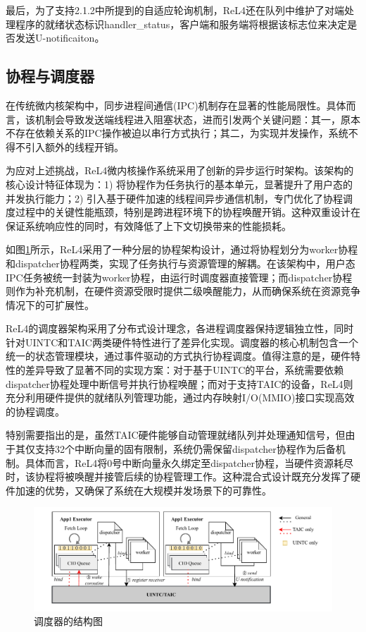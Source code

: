 最后，为了支持2.1.2中所提到的自适应轮询机制，ReL4还在队列中维护了对端处理程序的就绪状态标识handler\_status，客户端和服务端将根据该标志位来决定是否发送U-notificaiton。

\subsection{协程与调度器}
在传统微内核架构中，同步进程间通信(IPC)机制存在显著的性能局限性。具体而言，该机制会导致发送端线程进入阻塞状态，进而引发两个关键问题：其一，原本不存在依赖关系的IPC操作被迫以串行方式执行；其二，为实现并发操作，系统不得不引入额外的线程开销。

为应对上述挑战，ReL4微内核操作系统采用了创新的异步运行时架构。该架构的核心设计特征体现为：1) 将协程作为任务执行的基本单元，显著提升了用户态的并发执行能力；2) 引入基于硬件加速的线程间异步通信机制，专门优化了协程调度过程中的关键性能瓶颈，特别是跨进程环境下的协程唤醒开销。这种双重设计在保证系统响应性的同时，有效降低了上下文切换带来的性能损耗。

如图\ref{fig:executor}所示，ReL4采用了一种分层的协程架构设计，通过将协程划分为worker协程和dispatcher协程两类，实现了任务执行与资源管理的解耦。在该架构中，用户态IPC任务被统一封装为worker协程，由运行时调度器直接管理；而dispatcher协程则作为补充机制，在硬件资源受限时提供二级唤醒能力，从而确保系统在资源竞争情况下的可扩展性。

ReL4的调度器架构采用了分布式设计理念，各进程调度器保持逻辑独立性，同时针对UINTC和TAIC两类硬件特性进行了差异化实现。调度器的核心机制包含一个统一的状态管理模块，通过事件驱动的方式执行协程调度。值得注意的是，硬件特性的差异导致了显著不同的实现方案：对于基于UINTC的平台，系统需要依赖dispatcher协程处理中断信号并执行协程唤醒；而对于支持TAIC的设备，ReL4则充分利用硬件提供的就绪队列管理功能，通过内存映射I/O(MMIO)接口实现高效的协程调度。

特别需要指出的是，虽然TAIC硬件能够自动管理就绪队列并处理通知信号，但由于其仅支持32个中断向量的固有限制，系统仍需保留dispatcher协程作为后备机制。具体而言，ReL4将0号中断向量永久绑定至dispatcher协程，当硬件资源耗尽时，该协程将被唤醒并接管后续的协程管理工作。这种混合式设计既充分发挥了硬件加速的优势，又确保了系统在大规模并发场景下的可靠性。


\begin{figure}[htbp]
  \centering
  \includegraphics[width=1.0\textwidth]{figures/TAIC.drawio.pdf}
  \caption{调度器的结构图}\label{fig:executor}
\end{figure}

